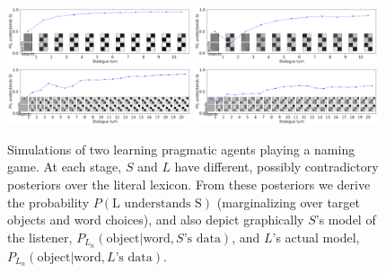 \documentclass{article} %
\newcommand{\word}{\text{word}}
\newcommand{\obj}{\text{object}}
\begin{document}
\begin{figure}[t]
\centering
\includegraphics[width=0.48\textwidth]{figures/emergence2x2-1.pdf}
\includegraphics[width=0.48\textwidth]{figures/emergence2x2-3.pdf} \\
\includegraphics[width=0.48\textwidth]{figures/emergence3x3-0.pdf}
\includegraphics[width=0.48\textwidth]{figures/emergence3x3-1.pdf} \\
\caption{\label{fig:emergence} Simulations of two learning pragmatic agents playing a naming game. At each stage, $S$ and $L$ have different, possibly contradictory posteriors over the literal lexicon. From these posteriors we derive the probability $P(\text{L understands S})$ (marginalizing over target objects and word choices), and also depict graphically $S$'s model of the listener, $P_{L_n}(\obj | \word, \text{$S$'s data})$, and $L$'s actual model, $P_{L_n}(\obj | \word, \text{$L$'s data})$.}
\end{figure}
\end{document}
